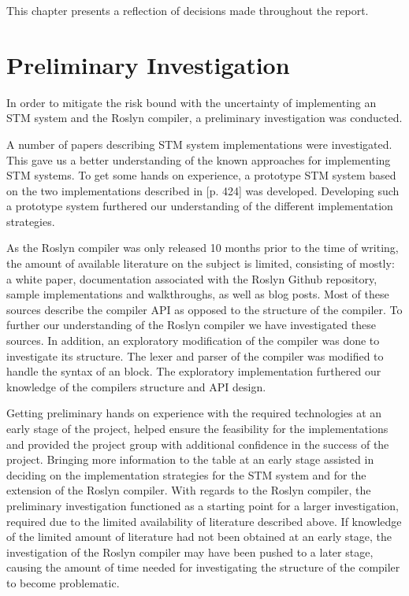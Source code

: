 \makeatletter {}\makeatother
{}
\label{chap:reflection}
This chapter presents a reflection of decisions made throughout the report.

\section{Preliminary Investigation}
In order to mitigate the risk bound with the uncertainty of implementing an \ac{STM} system and the Roslyn compiler, a preliminary investigation was conducted. 

A number of papers describing \ac{STM} system implementations were investigated. This gave us a better understanding of the known approaches for implementing \ac{STM} systems. To get some hands on experience, a prototype \ac{STM} system based on the two implementations described in \cite{herlihy2012art}[p. 424] was developed. Developing such a prototype system furthered our understanding of the different implementation strategies.

As the Roslyn compiler was only released 10 months prior to the time of writing, the amount of available literature on the subject is limited, consisting of mostly: a white paper\cite{ng2012roslyn}, documentation associated with the Roslyn Github repository\cite{roslynwiki}, sample implementations and walkthroughs\cite{roslynsamples}, as well as blog posts. Most of these sources describe the compiler \ac{API} as opposed to the structure of the compiler. To further our understanding of the Roslyn compiler we have investigated these sources. In addition, an exploratory modification of the compiler was done to investigate its structure. The lexer and parser of the compiler was modified to handle the syntax of an  block. The exploratory implementation furthered our knowledge of the compilers structure and \ac{API} design.

Getting preliminary hands on experience with the required technologies at an early stage of the project, helped ensure the feasibility for the implementations and provided the project group with additional confidence in the success of the project. Bringing more information to the table at an early stage assisted in deciding on the implementation strategies for the \ac{STM} system and for the extension of the Roslyn compiler. With regards to the Roslyn compiler, the preliminary investigation functioned as a starting point for a larger investigation, required due to the limited availability of literature described above. If knowledge of the limited amount of literature had not been obtained at an early stage, the investigation of the Roslyn compiler may have been pushed to a later stage, causing the amount of time needed for investigating the structure of the compiler to become problematic.

